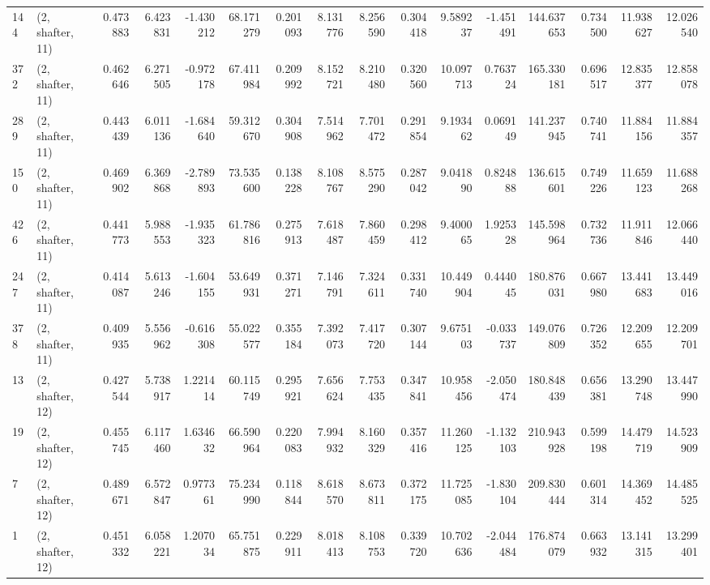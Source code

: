 \begin{tabular}{llrrrrrrrrrrrrrr}
144 &  (2, shafter, 11) &   0.473883 &   6.423831 &  -1.430212 &    68.171279 &   0.201093 &   8.131776 &   8.256590 &  0.304418 &   9.589237 &  -1.451491 &   144.637653 &   0.734500 &  11.938627 &  12.026540 \\
372 &  (2, shafter, 11) &   0.462646 &   6.271505 &  -0.972178 &    67.411984 &   0.209992 &   8.152721 &   8.210480 &  0.320560 &  10.097713 &   0.763724 &   165.330181 &   0.696517 &  12.835377 &  12.858078 \\
289 &  (2, shafter, 11) &   0.443439 &   6.011136 &  -1.684640 &    59.312670 &   0.304908 &   7.514962 &   7.701472 &  0.291854 &   9.193462 &   0.069149 &   141.237945 &   0.740741 &  11.884156 &  11.884357 \\
150 &  (2, shafter, 11) &   0.469902 &   6.369868 &  -2.789893 &    73.535600 &   0.138228 &   8.108767 &   8.575290 &  0.287042 &   9.041890 &   0.824888 &   136.615601 &   0.749226 &  11.659123 &  11.688268 \\
426 &  (2, shafter, 11) &   0.441773 &   5.988553 &  -1.935323 &    61.786816 &   0.275913 &   7.618487 &   7.860459 &  0.298412 &   9.400065 &   1.925328 &   145.598964 &   0.732736 &  11.911846 &  12.066440 \\
247 &  (2, shafter, 11) &   0.414087 &   5.613246 &  -1.604155 &    53.649931 &   0.371271 &   7.146791 &   7.324611 &  0.331740 &  10.449904 &   0.444045 &   180.876031 &   0.667980 &  13.441683 &  13.449016 \\
378 &  (2, shafter, 11) &   0.409935 &   5.556962 &  -0.616308 &    55.022577 &   0.355184 &   7.392073 &   7.417720 &  0.307144 &   9.675103 &  -0.033737 &   149.076809 &   0.726352 &  12.209655 &  12.209701 \\
13  &  (2, shafter, 12) &   0.427544 &   5.738917 &   1.221414 &    60.115749 &   0.295921 &   7.656624 &   7.753435 &  0.347841 &  10.958456 &  -2.050474 &   180.848439 &   0.656381 &  13.290748 &  13.447990 \\
19  &  (2, shafter, 12) &   0.455745 &   6.117460 &   1.634632 &    66.590964 &   0.220083 &   7.994932 &   8.160329 &  0.357416 &  11.260125 &  -1.132103 &   210.943928 &   0.599198 &  14.479719 &  14.523909 \\
7   &  (2, shafter, 12) &   0.489671 &   6.572847 &   0.977361 &    75.234990 &   0.118844 &   8.618570 &   8.673811 &  0.372175 &  11.725085 &  -1.830104 &   209.830444 &   0.601314 &  14.369452 &  14.485525 \\
1   &  (2, shafter, 12) &   0.451332 &   6.058221 &   1.207034 &    65.751875 &   0.229911 &   8.018413 &   8.108753 &  0.339720 &  10.702636 &  -2.044484 &   176.874079 &   0.663932 &  13.141315 &  13.299401 \\

\end{tabular}

